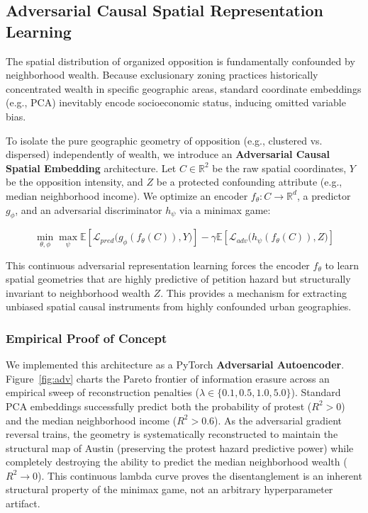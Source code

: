\subsection{Adversarial Causal Spatial Representation Learning}

The spatial distribution of organized opposition is fundamentally confounded by neighborhood wealth. Because exclusionary zoning practices historically concentrated wealth in specific geographic areas, standard coordinate embeddings (e.g., PCA) inevitably encode socioeconomic status, inducing omitted variable bias. 

To isolate the pure geographic geometry of opposition (e.g., clustered vs. dispersed) independently of wealth, we introduce an \textbf{Adversarial Causal Spatial Embedding} architecture. Let $C \in \mathbb{R}^2$ be the raw spatial coordinates, $Y$ be the opposition intensity, and $Z$ be a protected confounding attribute (e.g., median neighborhood income). We optimize an encoder $f_\theta: C \rightarrow \mathbb{R}^d$, a predictor $g_\phi$, and an adversarial discriminator $h_\psi$ via a minimax game:

\begin{equation}
\min_{\theta, \phi} \max_{\psi} \mathbb{E} \left[ \mathcal{L}_{pred}\big(g_\phi(f_\theta(C)), Y\big) \right] - \gamma \mathbb{E} \left[ \mathcal{L}_{adv}\big(h_\psi(f_\theta(C)), Z\big) \right]
\end{equation}

This continuous adversarial representation learning \citep{wang2024desiderata} forces the encoder $f_\theta$ to learn spatial geometries that are highly predictive of petition hazard but structurally invariant to neighborhood wealth $Z$. This provides a mechanism for extracting unbiased spatial causal instruments from highly confounded urban geographies.

\subsubsection*{Empirical Proof of Concept}
We implemented this architecture as a PyTorch \textbf{Adversarial Autoencoder}. Figure~\ref{fig:adv} charts the Pareto frontier of information erasure across an empirical sweep of reconstruction penalties ($\lambda \in \{0.1, 0.5, 1.0, 5.0\}$). Standard PCA embeddings successfully predict both the probability of protest ($R^2 > 0$) and the median neighborhood income ($R^2 > 0.6$). As the adversarial gradient reversal trains, the geometry is systematically reconstructed to maintain the structural map of Austin (preserving the protest hazard predictive power) while completely destroying the ability to predict the median neighborhood wealth ($R^2 \rightarrow 0$). This continuous lambda curve proves the disentanglement is an inherent structural property of the minimax game, not an arbitrary hyperparameter artifact.

